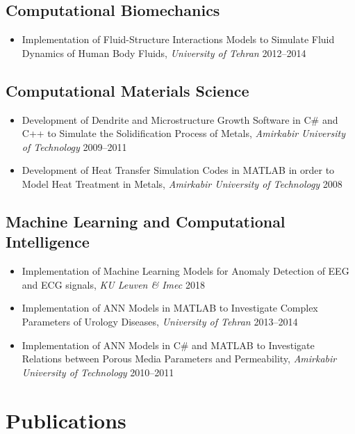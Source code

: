 \documentclass{cv}
\begin{document}
\subsection{Computational Biomechanics}

\begin{itemize}
\item
Implementation of Fluid-Structure Interactions Models to Simulate Fluid Dynamics of Human Body Fluids, \textit{University of Tehran} \hfill 2012--2014
\end{itemize}

\subsection{Computational Materials Science}

\begin{itemize}
\item
Development of Dendrite and Microstructure Growth Software in C\# and C++ to Simulate the Solidification Process of Metals, \textit{Amirkabir University of Technology} \hfill 2009--2011
\item
Development of Heat Transfer Simulation Codes in MATLAB in order to Model Heat Treatment in Metals, \textit{Amirkabir University of Technology} \hfill 2008
\end{itemize}

\subsection{Machine Learning and Computational Intelligence}

\begin{itemize}
\item
Implementation of Machine Learning Models for Anomaly Detection of EEG and ECG signals, \textit{KU Leuven \& Imec} \hfill 2018
\item
Implementation of ANN Models in MATLAB to Investigate Complex Parameters of Urology Diseases, \textit{University of Tehran} \hfill 2013--2014
\item
Implementation of ANN Models in C\# and MATLAB to Investigate Relations between Porous Media Parameters and Permeability, \textit{Amirkabir University of Technology} \hfill 2010--2011
\end{itemize}



\section{Publications}
\end{document}
